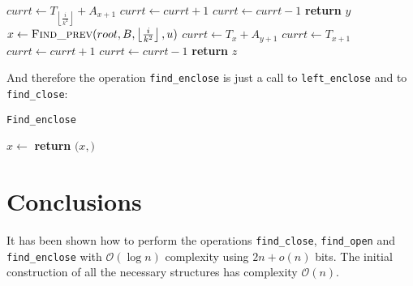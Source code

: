 \documentclass{article}
\begin{document}
    \begin{algorithm}[ht]
    \begin{algorithmic}[1]
            \EndIf
        \EndFor
        \State
                \State $currt\gets T_{\left\lfloor{\frac{i}{k^2}}\right\rfloor}+A_{x+1}$
                        \State $currt\gets currt+1$
                    \EndIf
                        \State $currt\gets currt-1$
                    \EndIf
                        \State \textbf{return} $y$
                    \EndIf
                \EndFor
            \EndIf
        \EndFor
        \State
        \State $x\gets \Call{Find\_prev}{root,B,\left\lfloor{\frac{i}{k^2}}\right\rfloor,u}$ 
                    \State $currt\gets T_x+A_{y+1}$
                \Else
                    \State $currt\gets T_{x+1}$
                \EndIf
                        \State $currt\gets currt+1$
                    \EndIf
                        \State $currt\gets currt-1$
                    \EndIf
                        \State \textbf{return} $z$
                    \EndIf
                \EndFor
            \EndIf
        \EndFor
    \EndProcedure
    \end{algorithmic}
    \end{algorithm}
And therefore the operation \texttt{find\_enclose} is just a call to \texttt{left\_enclose} and to \texttt{find\_close}:
    \begin{algorithm}[H]
    \caption{\texttt{Find\_enclose}}\label{findenclose}
    \begin{algorithmic}[1]
    \State $x\gets$ 
    \State \textbf{return} $(x,$$)$
    \EndProcedure
    \end{algorithmic}
    \end{algorithm}
\section{Conclusions}
It has been shown how to perform the operations \texttt{find\_close}, \texttt{find\_open} and \texttt{find\_enclose} with $\mathcal{O}(\log{n})$ complexity using $2n+o(n)$ bits. The initial construction of all the necessary structures has complexity $\mathcal{O}(n)$.
\end{document}
